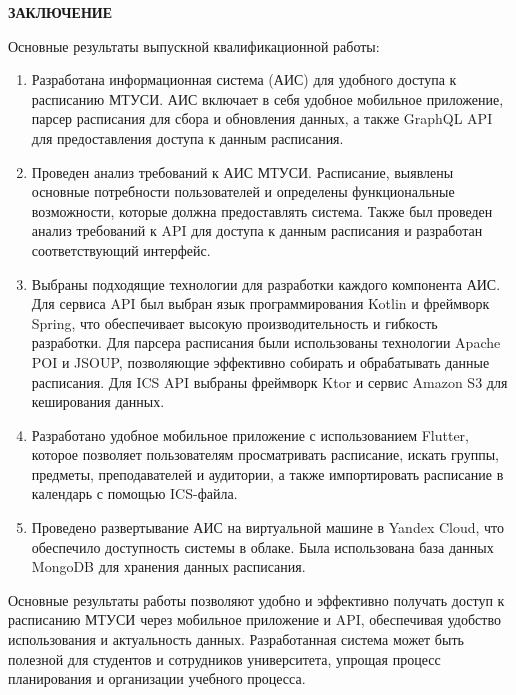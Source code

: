 \newpage
\begin{center}
  \textbf{\large ЗАКЛЮЧЕНИЕ}
\end{center}


Основные результаты выпускной квалификационной работы:
\begin{enumerate}

\item Разработана информационная система (АИС) для удобного доступа к расписанию МТУСИ. 
АИС включает в себя удобное мобильное приложение, парсер расписания для сбора и обновления данных, 
а также GraphQL API для предоставления доступа к данным расписания.

\item Проведен анализ требований к АИС МТУСИ. Расписание, 
выявлены основные потребности пользователей и определены функциональные возможности, 
которые должна предоставлять система. Также был проведен анализ требований к API для доступа 
к данным расписания и разработан соответствующий интерфейс.

\item Выбраны подходящие технологии для разработки каждого компонента АИС. 
Для сервиса API был выбран язык программирования Kotlin и фреймворк Spring, 
что обеспечивает высокую производительность и гибкость разработки. 
Для парсера расписания были использованы технологии Apache POI и JSOUP, 
позволяющие эффективно собирать и обрабатывать данные расписания. 
Для ICS API выбраны фреймворк Ktor и сервис Amazon S3 для кеширования данных.

\item Разработано удобное мобильное приложение с использованием Flutter, 
которое позволяет пользователям просматривать расписание, искать группы, предметы, 
преподавателей и аудитории, а также импортировать расписание в календарь с помощью ICS-файла.

\item Проведено развертывание АИС на виртуальной машине в Yandex Cloud, 
что обеспечило доступность системы в облаке. Была использована база данных MongoDB 
для хранения данных расписания.

\end{enumerate}
Основные результаты работы позволяют удобно и эффективно получать доступ к 
расписанию МТУСИ через мобильное приложение и API, обеспечивая удобство 
использования и актуальность данных. Разработанная система может быть полезной для 
студентов и сотрудников университета, упрощая процесс планирования и организации учебного процесса.
